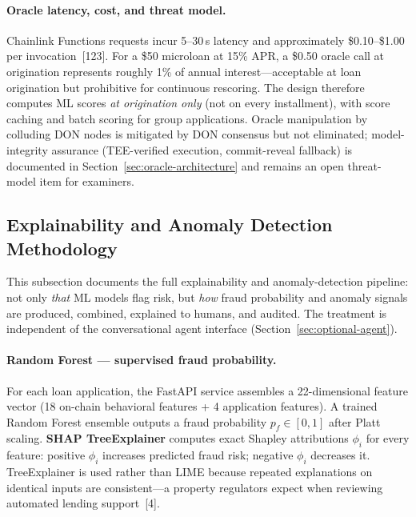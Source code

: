 \documentclass[12pt,a4paper]{report}
\begin{document}
\paragraph{Oracle latency, cost, and threat model.}
Chainlink Functions requests incur 5--30\,s latency and approximately \$0.10--\$1.00 per invocation~[123]. For a \$50 microloan at 15\% APR, a \$0.50 oracle call at origination represents roughly 1\% of annual interest---acceptable at loan origination but prohibitive for continuous rescoring. The design therefore computes ML scores \textit{at origination only} (not on every installment), with score caching and batch scoring for group applications. Oracle manipulation by colluding DON nodes is mitigated by DON consensus but not eliminated; model-integrity assurance (TEE-verified execution, commit-reveal fallback) is documented in Section~\ref{sec:oracle-architecture} and remains an open threat-model item for examiners.

\subsection{Explainability and Anomaly Detection Methodology}
\label{sec:ml-explainability}

This subsection documents the full explainability and anomaly-detection pipeline: not only \textit{that} ML models flag risk, but \textit{how} fraud probability and anomaly signals are produced, combined, explained to humans, and audited. The treatment is independent of the conversational agent interface (Section~\ref{sec:optional-agent}).

\paragraph{Random Forest --- supervised fraud probability.}
For each loan application, the FastAPI service assembles a 22-dimensional feature vector (18 on-chain behavioral features + 4 application features). A trained Random Forest ensemble outputs a fraud probability $p_f \in [0,1]$ after Platt scaling. \textbf{SHAP TreeExplainer} computes exact Shapley attributions $\phi_i$ for every feature: positive $\phi_i$ increases predicted fraud risk; negative $\phi_i$ decreases it. TreeExplainer is used rather than LIME because repeated explanations on identical inputs are consistent---a property regulators expect when reviewing automated lending support~[4].
\end{document}
